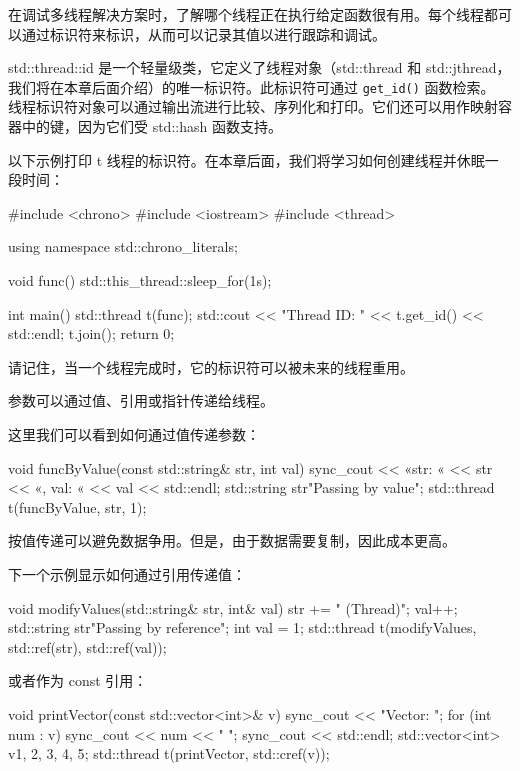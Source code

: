 
在调试多线程解决方案时，了解哪个线程正在执行给定函数很有用。每个线程都可以通过标识符来标识，从而可以记录其值以进行跟踪和调试。

std::thread::id 是一个轻量级类，它定义了线程对象（std::thread 和 std::jthread，我们将在本章后面介绍）的唯一标识符。此标识符可通过 \verb|get_id()| 函数检索。
线程标识符对象可以通过输出流进行比较、序列化和打印。它们还可以用作映射容器中的键，因为它们受 std::hash 函数支持。

以下示例打印 t 线程的标识符。在本章后面，我们将学习如何创建线程并休眠一段时间：

\begin{cpp}
#include <chrono>
#include <iostream>
#include <thread>

using namespace std::chrono_literals;

void func() {
    std::this_thread::sleep_for(1s);
}

int main() {
    std::thread t(func);
    std::cout << "Thread ID: " << t.get_id() << std::endl;
    t.join();
    return 0;
}
\end{cpp}

请记住，当一个线程完成时，它的标识符可以被未来的线程重用。


参数可以通过值、引用或指针传递给线程。

这里我们可以看到如何通过值传递参数：

\begin{cpp}
void funcByValue(const std::string& str, int val) {
    sync_cout << «str: « << str << «, val: « << val
    << std::endl;
}
std::string str{"Passing by value"};
std::thread t(funcByValue, str, 1);
\end{cpp}

按值传递可以避免数据争用。但是，由于数据需要复制，因此成本更高。

下一个示例显示如何通过引用传递值：

\begin{cpp}
void modifyValues(std::string& str, int& val) {
    str += " (Thread)";
    val++;
}
std::string str{"Passing by reference"};
int val = 1;
std::thread t(modifyValues, std::ref(str), std::ref(val));
\end{cpp}

或者作为 const 引用：

\begin{cpp}
void printVector(const std::vector<int>& v) {
    sync_cout << "Vector: ";
    for (int num : v) {
        sync_cout << num << " ";
    }
    sync_cout << std::endl;
}
std::vector<int> v{1, 2, 3, 4, 5};
std::thread t(printVector, std::cref(v));
\end{cpp}

